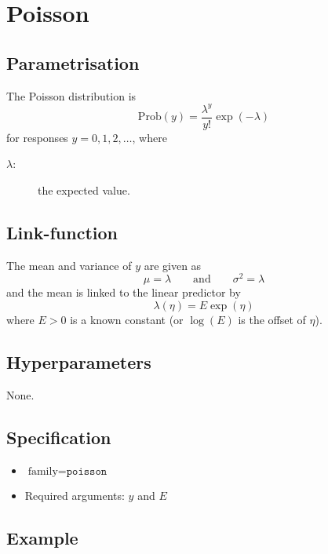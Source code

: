 \documentclass[a4paper,11pt]{article}
\begin{document}
\section*{Poisson}

\subsection*{Parametrisation}

The Poisson distribution is
\begin{displaymath}
    \text{Prob}(y) = \frac{\lambda^{y}}{y!}\exp(-\lambda)
\end{displaymath}
for responses $y=0, 1, 2, \ldots$, where
\begin{description}
\item[$\lambda$:] the expected value.
\end{description}

\subsection*{Link-function}

The mean and variance of $y$ are given as
\begin{displaymath}
    \mu = \lambda \qquad\text{and}\qquad \sigma^{2} = \lambda
\end{displaymath}
and the mean is linked to the linear predictor by
\begin{displaymath}
    \lambda(\eta) = E \exp(\eta)
\end{displaymath}
where $E>0$ is a known constant (or $\log(E)$ is the offset of $\eta$).

\subsection*{Hyperparameters}

None.

\subsection*{Specification}

\begin{itemize}
\item $\text{family}=\texttt{poisson}$
\item Required arguments: $y$ and $E$
\end{itemize}

\subsection*{Example}
\end{document}
